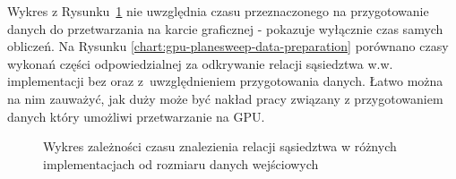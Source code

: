 \documentclass[12pt]{article}
\begin{document}
Wykres z Rysunku~\ref{chart:planesweep-datasize} nie uwzględnia czasu przeznaczonego na przygotowanie danych do przetwarzania na karcie graficznej - pokazuje wyłącznie czas samych obliczeń. Na Rysunku \ref{chart:gpu-planesweep-data-preparation} porównano czasy wykonań części odpowiedzialnej za odkrywanie relacji sąsiedztwa w.w. implementacji bez oraz z~uwzględnieniem przygotowania danych. Łatwo można na nim zauważyć, jak duży może być nakład pracy związany z przygotowaniem danych który umożliwi przetwarzanie na GPU.
\begin{figure}[H]
\caption{Wykres zależności czasu znalezienia relacji sąsiedztwa w różnych implementacjach od rozmiaru danych wejściowych}
\label{chart:planesweep-datasize}
\end{figure}
\end{document}
